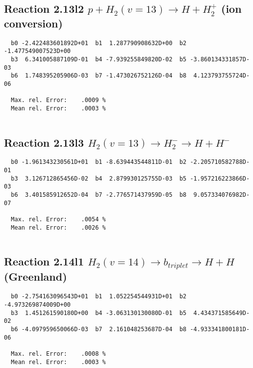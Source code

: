 \documentclass[12pt]{article}
\begin{document}
\subsection{
Reaction 2.13l2
$ p + H_2(v=13) \rightarrow H + H_2^+$ (ion conversion)
}


\begin{small}\begin{verbatim}
  b0 -2.422483601892D+01  b1  1.287790908632D+00  b2 -1.477549007523D+00
  b3  6.341005887109D-01  b4 -7.939255849820D-02  b5 -3.860134331857D-03
  b6  1.748395205906D-03  b7 -1.473026752126D-04  b8  4.123793755724D-06

  Max. rel. Error:    .0009 %
  Mean rel. Error:    .0003 %


\end{verbatim}\end{small}


\subsection{
Reaction 2.13l3
 $ H_2(v=13) \rightarrow H_2^- \rightarrow H + H^-$
}


\begin{small}\begin{verbatim}
  b0 -1.961343230561D+01  b1 -8.639443544811D-01  b2 -2.205710582788D-01
  b3  3.126712865456D-02  b4  2.879930125755D-03  b5 -1.957216223866D-03
  b6  3.401585912652D-04  b7 -2.776571437959D-05  b8  9.057334076982D-07

  Max. rel. Error:    .0054 %
  Mean rel. Error:    .0026 %


\end{verbatim}\end{small}


\newpage
\subsection{
Reaction 2.14l1
$ H_2(v=14) \rightarrow b_{triplet}\rightarrow H + H $ (Greenland) 
}


\begin{small}\begin{verbatim}
  b0 -2.754163096543D+01  b1  1.052254544931D+01  b2 -4.973269874009D+00
  b3  1.451261590180D+00  b4 -3.063130130080D-01  b5  4.434371585649D-02
  b6 -4.097959650066D-03  b7  2.161048253687D-04  b8 -4.933341800181D-06

  Max. rel. Error:    .0008 %
  Mean rel. Error:    .0003 %


\end{verbatim}\end{small}
\end{document}
